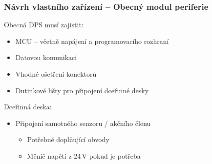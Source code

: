 \documentclass[%
  12pt,       				%
	t,                  %
	aspectratio=1610,   %
	unicode,						%
]{beamer}				    	%
\begin{document}
\begin{frame}[fragile]
	\frametitle{Návrh vlastního zařízení -- Obecný modul periferie}
	Obecná DPS musí zajistit:\\[1ex]
	\begin{itemize}
		\item MCU -- včetně napájení a programovacího rozhraní
		\item Datovou komunikaci 
		\item Vhodné ošetření konektorů
		\item Dutinkové lišty pro připojení dceřinné desky 
	\end{itemize}
	\vspace{2em}
	Dceřinná deska:\\[1ex]
	\begin{itemize}
		\item Připojení samotného senzoru / akčního členu 
		\begin{itemize}
			\item Potřebné doplňující obvody
			\item Měnič napětí z 24\,V pokud je potřeba 
		\end{itemize}
	\end{itemize}
\end{frame}
\end{document}
